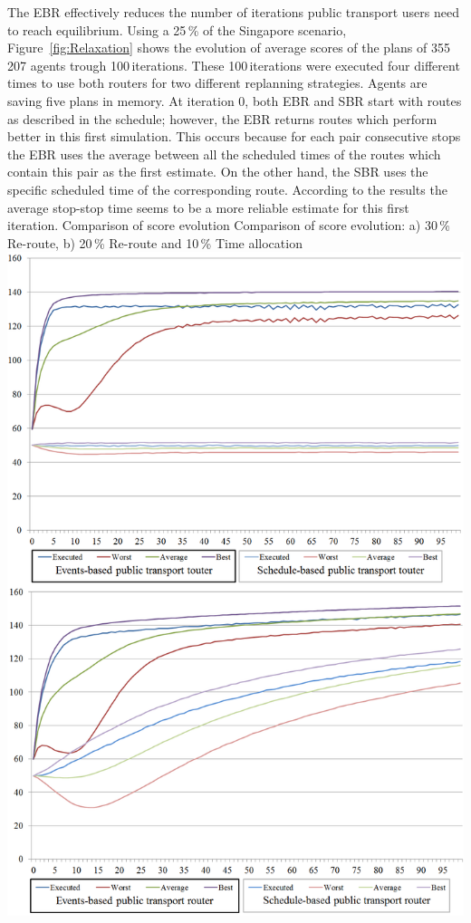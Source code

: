 The EBR effectively reduces the number of iterations public transport users need to reach equilibrium. Using a 25\,\% of the Singapore scenario, Figure~\ref{fig:Relaxation} shows the evolution of average scores of the plans of 355\,207 agents trough 100\,iterations. These 100\,iterations were executed four different times to use both routers for two different replanning strategies. Agents are saving five plans in memory. At iteration 0, both EBR and SBR start with routes as described in the schedule; however, the EBR returns routes which perform better in this first simulation. This occurs because for each pair consecutive stops the EBR uses the average between all the scheduled times of the routes which contain this pair as the first estimate. On the other hand, the SBR uses the specific scheduled time of the corresponding route. According to the results the average stop-stop time seems to be a more reliable estimate for this first iteration.
\createfigure
{Comparison of score evolution}
{Comparison of score evolution: a) 30\,\% Re-route, b) 20\,\% Re-route and 10\,\% Time allocation}
{\label{fig:Relaxation}}
{\includegraphics[width=1.0\textwidth]{extending/figures/ebr/Relaxation.png}}
{}

